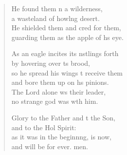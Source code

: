 \begin{verse}
\begin{patverse}
He found them \pointup{\i}n a wilderness,\Med\\
a wasteland of howl\pointup{\i}ng desert.\\
He shielded them and cred for them,\Med\\
guarding them as the apple of h\pointup{\i}s eye.

As an eagle incites its nstlings forth\Med\\
by hovering over \pointup{\i}ts brood,\\
so he spread his wings t receive them\Med\\
and bore them up on h\pointup{\i}s pinions.\\
The Lord alone ws their leader,\Med\\
no strange god was w\pointup{\i}th him.

Glory to the Father and t the Son,\Med\\
and to the Hol Spirit:\\
as it was in the beginn\pointup{\i}ng, is now,\Med\\
and will be for ever. men.
  \end{patverse}
\end{verse}
